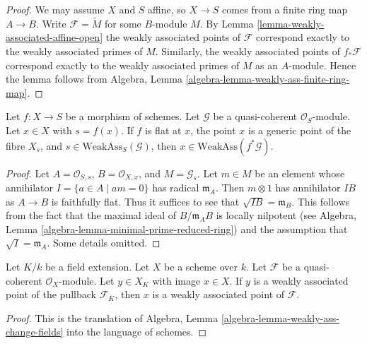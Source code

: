 \begin{proof}
We may assume $X$ and $S$ affine, so $X \to S$ comes from a finite ring map
$A \to B$. Write $\mathcal{F} = \widetilde M$ for some $B$-module $M$. By
Lemma \ref{lemma-weakly-associated-affine-open}
the weakly associated points of $\mathcal{F}$ correspond exactly to the
weakly associated primes of $M$. Similarly, the weakly associated points
of $f_*\mathcal{F}$ correspond exactly to the weakly associated primes
of $M$ as an $A$-module. Hence the lemma follows from
Algebra, Lemma \ref{algebra-lemma-weakly-ass-finite-ring-map}.
\end{proof}

\begin{lemma}
\label{lemma-weakly-ass-pullback}
Let $f : X \to S$ be a morphism of schemes. Let $\mathcal{G}$ be a
quasi-coherent $\mathcal{O}_S$-module. Let $x \in X$ with $s = f(x)$.
If $f$ is flat at $x$, the point $x$ is a generic point of the fibre $X_s$, and
$s \in \text{WeakAss}_S(\mathcal{G})$, then
$x \in \text{WeakAss}(f^*\mathcal{G})$.
\end{lemma}

\begin{proof}
Let $A = \mathcal{O}_{S, s}$, $B = \mathcal{O}_{X, x}$, and
$M = \mathcal{G}_s$. Let $m \in M$ be an element whose annihilator
$I = \{a \in A \mid am = 0\}$ has radical $\mathfrak m_A$. Then
$m \otimes 1$ has annihilator $I B$ as $A \to B$ is
faithfully flat. Thus it suffices to see that $\sqrt{I B} = \mathfrak m_B$.
This follows from the fact that the maximal ideal of $B/\mathfrak m_AB$
is locally nilpotent (see
Algebra, Lemma \ref{algebra-lemma-minimal-prime-reduced-ring})
and the assumption that $\sqrt{I} = \mathfrak m_A$.
Some details omitted.
\end{proof}

\begin{lemma}
\label{lemma-weakly-ass-change-fields}
Let $K/k$ be a field extension. Let $X$ be a scheme over $k$.
Let $\mathcal{F}$ be a quasi-coherent $\mathcal{O}_X$-module.
Let $y \in X_K$ with image $x \in X$. If $y$ is a weakly
associated point of the pullback $\mathcal{F}_K$, then $x$
is a weakly associated point of $\mathcal{F}$.
\end{lemma}

\begin{proof}
This is the translation of
Algebra, Lemma \ref{algebra-lemma-weakly-ass-change-fields}
into the language of schemes.
\end{proof}








